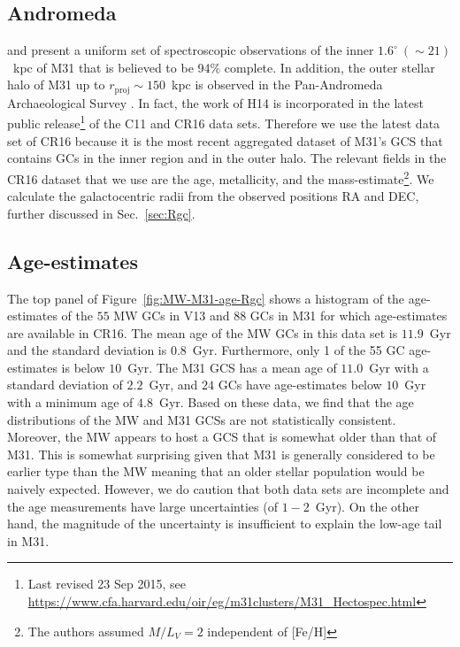 \documentclass[a4paper,fleqn,usenatbib]{mnras}
\begin{document}
\subsection{Andromeda}
\label{sec:andromeda}
\citet[][hereafter C11]{2011AJ....141...61C} and \citet[][hereafter CR16]{2016ApJ...824...42C}
present a uniform set of spectroscopic observations of the inner 
$1.6^\circ~({\sim}21)$~kpc of M31 that is believed to be 94\% complete. In addition,
the outer stellar halo of M31 up to $r_{\text{proj}}\sim150$~kpc is observed in 
the Pan-Andromeda Archaeological Survey \citep[PAndAS, ][hereafter H14]{2014MNRAS.442.2165H,
2014MNRAS.442.2929V, 2019MNRAS.484.1756M}. In fact, 
the work of H14 is incorporated in the latest public release\footnote{Last 
revised 23 Sep 2015, see \url{https://www.cfa.harvard.edu/oir/eg/m31clusters/M31_Hectospec.html}}
of the C11 and CR16 data sets. Therefore we use the latest data set of CR16 
because it is the most recent aggregated dataset of M31's GCS that contains GCs 
in the inner region and in the outer halo. The relevant fields in the CR16 dataset 
that we use are the age, metallicity, and the mass-estimate\footnote{The authors 
assumed $M/L_V = 2$ independent of [Fe/H]}. We calculate the galactocentric radii 
from the observed positions RA and DEC, further discussed in Sec.~\ref{sec:Rgc}.

\subsection{Age-estimates}
\label{sec:age}
The top panel of Figure~\ref{fig:MW-M31-age-Rgc} shows a histogram of the age-estimates
of the $55$ MW GCs in V13 and $88$ GCs in M31 for which age-estimates are available
in CR16. The mean age of the MW GCs in this data set is $11.9$~Gyr and the 
standard deviation is $0.8$~Gyr. Furthermore, only 1 of the 55 GC age-estimates is
below $10$~Gyr. The M31 GCS has a mean age of $11.0$~Gyr with a standard deviation 
of $2.2$~Gyr, and $24$ GCs have age-estimates below $10$~Gyr with a minimum age 
of $4.8$~Gyr. Based on these data, we find that the age distributions of the MW 
and M31 GCSs are not statistically consistent. Moreover, the MW appears 
to host a GCS that is somewhat older than that of M31.
This is somewhat surprising given that M31 is generally considered to be earlier
type than the MW meaning that an older stellar population would be naively expected.
However, we do caution that both data sets are incomplete and the age 
measurements have large uncertainties (of $1-2$~Gyr). On the other hand, the 
magnitude of the uncertainty is insufficient to explain the low-age tail in M31.
\end{document}
